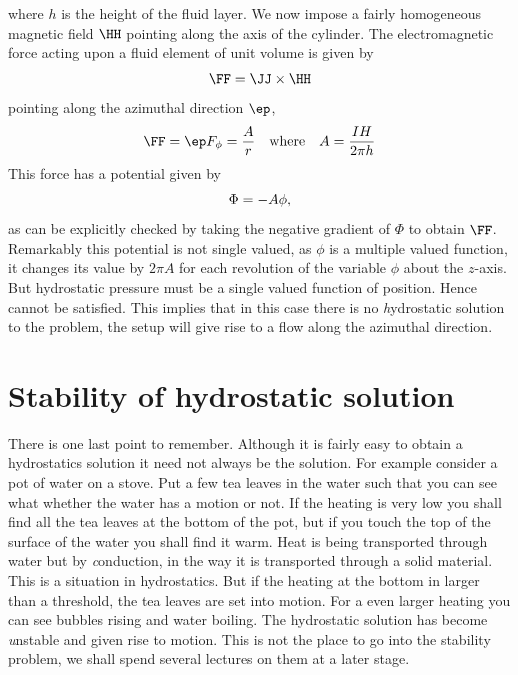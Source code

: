\documentclass{tufte-book} %
\begin{document}
where $h$ is the height of the fluid layer. 
We now impose a fairly homogeneous magnetic field $\HH$ 
pointing along the axis of the cylinder. The electromagnetic force
acting upon a fluid element of unit volume is given by 
\begin{equation}
\FF = \JJ \times \HH 
\end{equation}
pointing along the azimuthal direction $\ep$, 
\begin{equation}
\FF = \ep F_{\phi} = \frac{A}{r} \quad\text{where}\quad A = \frac{I
  H}{2\pi h} 
\end{equation}
This force has a potential given by 
\begin{equation}
\Phi = - A \phi \/,
\end{equation}
as can be explicitly checked by taking the negative gradient of $\Phi$
to obtain $\FF$. Remarkably this potential is not single valued, as
$\phi$ is a multiple valued function, it changes its value by $2\pi A$
for each revolution of the variable $\phi$ about the $z$-axis. 
But hydrostatic pressure must be a single valued function of
position. Hence  cannot be satisfied. This implies that in
this case there is no {\textit hydrostatic} solution to the problem,
the setup will give rise to a flow along the azimuthal direction. 
\section{Stability of hydrostatic solution}
There is one last point to remember. Although it is fairly easy to
obtain a hydrostatics solution it need not always be the solution. For
example consider a pot of water on a stove. Put a few tea leaves in
the water such that you can see what whether the water has a motion or
not. If the heating is very low you shall find all the tea leaves at
the bottom of the pot, but if you touch the top of the surface of the
water you shall find it warm. Heat is being transported through water
but by {\textit conduction}, in the way it is transported through a
solid material. This is a situation in hydrostatics. But if the
heating at the bottom in larger than a threshold, the tea leaves are
set into motion. For a even larger heating you can see bubbles rising
and water boiling. The hydrostatic solution has become {\textit
  unstable} and given rise to motion. This is not the place to go into
the stability problem, we shall spend several lectures on them at a
later stage. 
\newpage
\end{document}
